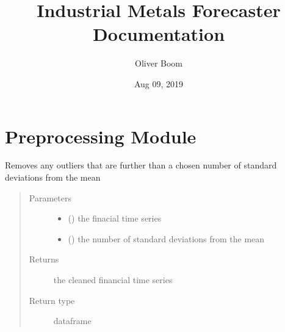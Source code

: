 \documentclass[letterpaper,10pt,english]{sphinxmanual}
\title{Industrial Metals Forecaster Documentation}
\date{Aug 09, 2019}
\author{Oliver Boom}
\begin{document}
\pagestyle{empty}
\sphinxmaketitle
\pagestyle{plain}
\sphinxtableofcontents
\pagestyle{normal}
\label{\detokenize{index::doc}}



\chapter{Preprocessing Module}
\label{\detokenize{index:module-Src.preprocessing}}\label{\detokenize{index:preprocessing-module}}

\begin{fulllineitems}
\label{\detokenize{index:Src.preprocessing.clean_data}}
Removes any outliers that are further than a chosen
number of standard deviations from the mean
\begin{quote}\begin{description}
\item[{Parameters}] \leavevmode\begin{itemize}
\item {} 
 () \textendash{} the finacial time series

\item {} 
 () \textendash{} the number of standard deviations from the mean

\end{itemize}

\item[{Returns}] \leavevmode
the cleaned financial time series

\item[{Return type}] \leavevmode
dataframe

\end{description}\end{quote}

\end{fulllineitems}

\end{document}
